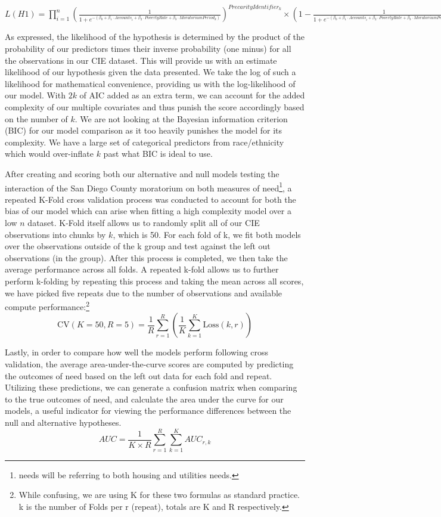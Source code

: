 \documentclass[man, 12pt, donotrepeattitle, floatsintext]{apa7} %
\begin{document}
$L(H1) = \prod_{i=1}^{n} \left(\frac{1}{1 + e^{-(\beta_0 + \beta_1 \cdot Accounts_i + \beta_2 \cdot PovertyRate + \beta_3 \cdot MoratoriumPeriod_{k})}}\right)^{PrecarityIdentifier_{k}} \times \left(1 - \frac{1}{1 + e^{-(\beta_0 + \beta_1 \cdot Accounts_i + \beta_2 \cdot PovertyRate + \beta_3 \cdot MoratoriumPeriod_{k})}}\right)^{(1 - PrecarityIdentifier_{k})}$
 
	As expressed, the likelihood of the hypothesis is determined by the product of the probability of our predictors times their inverse probability (one minus) for all the observations in our CIE dataset. This will provide us with an estimate likelihood of our hypothesis given the data presented. We take the log of such a likelihood for mathematical convenience, providing us with the log-likelihood of our model. With $2k$ of AIC added as an extra term, we can account for the added complexity of our multiple covariates and thus punish the score accordingly based on the number of $k$. We are not looking at the Bayesian information criterion (BIC) for our model comparison as it too heavily punishes the model for its complexity. We have a large set of categorical predictors from race/ethnicity which would over-inflate $k$ past what BIC is ideal to use.


After creating and scoring both our alternative and null models testing the interaction of the San Diego County moratorium on both measures of need\footnote{needs will be referring to both housing and utilities needs.}, a repeated K-Fold cross validation process was conducted to account for both the bias of our model which can arise when fitting a high complexity model over a low $n$ dataset. K-Fold itself allows us to randomly split all of our CIE observations into chunks by $k$, which is 50. For each fold of k, we fit both models over the observations outside of the k group and test against the left out observations (in the group). After this process is completed, we then take the average performance across all folds. A repeated k-fold allows us to further perform k-folding by repeating this process and taking the mean across all scores, we have picked five repeats due to the number of observations and available compute performance:\footnote{While confusing, we are using K for these two formulas as standard practice. k is the number of Folds per r (repeat), totals are K and R respectively.}
$$\text{CV}(K=50, R=5) = \frac{1}{R} \sum_{r=1}^{R} \left( \frac{1}{K} \sum_{k=1}^{K} \text{Loss}(k, r) \right) $$

Lastly, in order to compare how well the models perform following cross validation, the average area-under-the-curve scores are computed by predicting the outcomes of need based on the left out data for each fold and repeat. Utilizing these predictions, we can generate a confusion matrix when comparing to the true outcomes of need, and calculate the area under the curve for our models, a useful indicator for viewing the performance differences between the null and alternative hypotheses.
$$AUC = \frac{1}{K \times R} \sum_{r=1}^{R} \sum_{k=1}^{K} AUC_{r,k}$$
	
\end{document}
